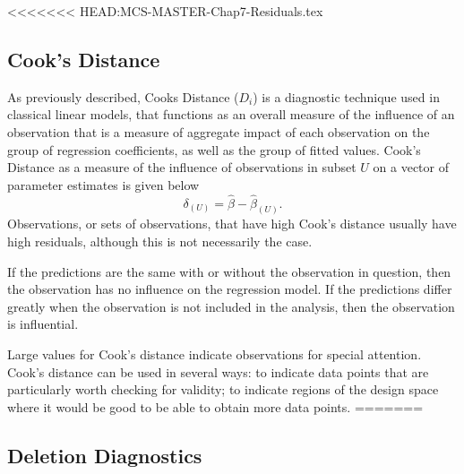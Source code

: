 \documentclass[12pt, a4paper]{report}
\theoremstyle{plain}
\theoremstyle{definition}
\theoremstyle{remark}
\begin{document}
	
	
	
<<<<<<< HEAD:MCS-MASTER-Chap7-Residuals.tex
	

	\subsection{Cook's Distance}
	As previously described,  Cooks Distance ($D_{i}$) is a diagnostic technique used in classical linear models, that functions as an overall measure of the influence of an observation that is a measure of aggregate impact of each observation on the group of regression coefficients, as well as the group of fitted values.  Cook's Distance as a measure of the influence of observations in subset $U$ on a vector of parameter estimates is given below \citep{cook77}
	\[ \delta_{(U)} = \hat{\beta} - \hat{\beta}_{(U)}.\]
	Observations, or sets of observations, that have high Cook's distance usually have high residuals, although this is not necessarily the case.
	
	
	If the predictions are the same with or without the observation in question, then the observation has no influence on the regression model. If the predictions differ greatly when the observation is not included in the analysis, then the observation is influential.
	
	
	
	Large values for Cook's distance indicate observations for special attention. Cook's distance can be used in several ways: to indicate data points that are particularly worth checking for validity; to indicate regions of the design space where it would be good to be able to obtain more data points.
=======
\newpage	

	\subsection{Deletion Diagnostics}
	
	
\end{document}
